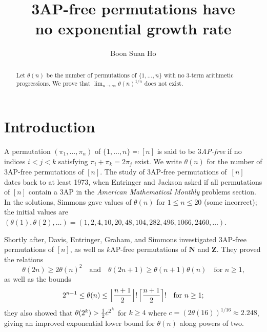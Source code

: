 \documentclass[twoside, reqno]{amsart} %
\begin{document}
\title[3AP-free permutations have no exponential growth rate]%
{3AP-free permutations have \\ no exponential growth rate}
\author{Boon Suan Ho}
\address{Department of Mathematics, National University of Singapore}


\begin{abstract} 
Let $\theta(n)$ be the number of permutations of $\{1,\dots,n\}$ with no
$3$-term arithmetic progressions.
We prove that 
$\lim_{n\to\infty}\theta(n)^{1/n}$ does not exist.
\end{abstract}

\maketitle

\section{Introduction}
A permutation $(\pi_1,\dots,\pi_n)$ of $\{1,\dots,n\}\eqqcolon[n]$ 
is said to be \emph{$3$AP-free} if no indices $i<j<k$ satisfying
$\pi_i+\pi_k=2\pi_j$ exist. We write $\theta(n)$ for the number of
$3$AP-free permutations of $[n]$.
The study of $3$AP-free permutations of~$[n]$
dates back to at least 1973, when Entringer and Jackson \cite{EJ73}
asked if all permutations of $[n]$ contain a $3$AP 
in the \textsl{American Mathematical Monthly} problems section.
In the solutions, Simmons \cite{Sim75}
gave values of $\theta(n)$ for $1\le n\le20$ (some incorrect);
the initial values are $(\theta(1),\theta(2),\dots)
=(1, 2, 4, 10, 20, 48, 104, 282, 496, 1066, 2460, \dots)$.

Shortly after, Davis, Entringer, Graham, and Simmons \cite{DEGS77}
investigated $3$AP-free permutations of $[n]$,
as well as $k$AP-free permutations of $\mathbf N$ and $\mathbf Z$.
They proved the relations 
\begin{equation*}
\theta(2n)\ge2\theta(n)^2 
\quad\text{and}\quad
\theta(2n+1)\ge\theta(n+1)\theta(n)
\quad\text{for $n\ge1$,}
\end{equation*} 
as well as the bounds 
\begin{equation*}
2^{n-1}\le\theta(n)\le\Bigl\lfloor{n+1\over2}\Bigr\rfloor!\,
\Bigl\lceil{n+1\over2}\Bigr\rceil!
\quad\text{for $n\ge1$;}
\end{equation*}
they also showed that
$\theta(2^k)>{1\over2}c^{2^k}$ for $k\ge4$ where $c=(2\theta(16))^{1/16}\approx2.248$,
giving an improved exponential lower bound for $\theta(n)$ along powers of two.
\end{document}
